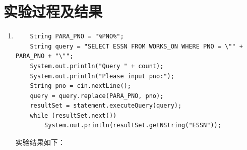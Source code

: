\documentclass{ML}
\begin{document}
\section{实验过程及结果}
\begin{enumerate}
    \item \begin{verbatim}
    String PARA_PNO = "%PNO%";
    String query = "SELECT ESSN FROM WORKS_ON WHERE PNO = \"" + PARA_PNO + "\"";
    System.out.println("Query " + count);
    System.out.println("Please input pno:");
    String pno = cin.nextLine();
    query = query.replace(PARA_PNO, pno);
    resultSet = statement.executeQuery(query);
    while (resultSet.next())
        System.out.println(resultSet.getNString("ESSN"));
    \end{verbatim}
    实验结果如下：
    \begin{figure}[htb]
        \centering

\end{figure}
\end{enumerate}
\end{document}
